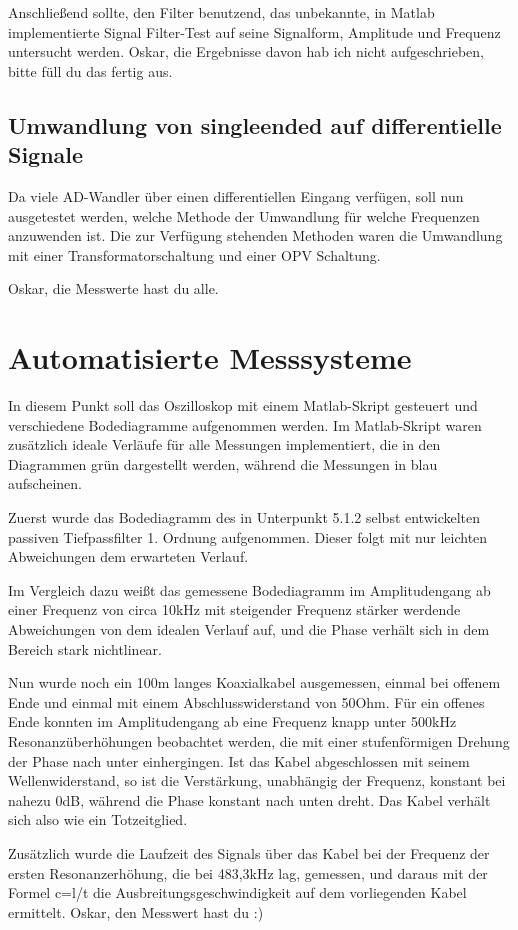 Anschließend sollte, den Filter benutzend, das unbekannte, in Matlab implementierte Signal Filter-Test auf seine Signalform, Amplitude und Frequenz untersucht werden. Oskar, die Ergebnisse davon hab ich nicht aufgeschrieben, bitte füll du das fertig aus.

\subsection{Umwandlung von singleended auf differentielle Signale}

Da viele AD-Wandler über einen differentiellen Eingang verfügen, soll nun ausgetestet werden, welche Methode der Umwandlung für welche Frequenzen anzuwenden ist. Die zur Verfügung stehenden Methoden waren die Umwandlung mit einer Transformatorschaltung und einer OPV Schaltung.

Oskar, die Messwerte hast du alle.
\section{Automatisierte Messsysteme}

In diesem Punkt soll das Oszilloskop mit einem Matlab-Skript gesteuert und verschiedene Bodediagramme aufgenommen werden. Im Matlab-Skript waren zusätzlich ideale Verläufe für alle Messungen implementiert, die in den Diagrammen grün dargestellt werden, während die Messungen in blau aufscheinen.

Zuerst wurde das Bodediagramm des in Unterpunkt 5.1.2 selbst entwickelten passiven Tiefpassfilter 1. Ordnung aufgenommen. Dieser folgt mit nur leichten Abweichungen dem erwarteten Verlauf.

Im Vergleich dazu weißt das gemessene Bodediagramm im Amplitudengang ab einer Frequenz von circa 10kHz mit steigender Frequenz stärker werdende Abweichungen von dem idealen Verlauf auf, und die Phase verhält sich in dem Bereich stark nichtlinear.

Nun wurde noch ein 100m langes Koaxialkabel ausgemessen, einmal bei offenem Ende und einmal mit einem Abschlusswiderstand von 50Ohm. Für ein offenes Ende konnten im Amplitudengang ab eine Frequenz knapp unter 500kHz Resonanzüberhöhungen beobachtet werden, die mit einer stufenförmigen Drehung der Phase nach unter einhergingen. Ist das Kabel abgeschlossen mit seinem Wellenwiderstand, so ist die Verstärkung, unabhängig der Frequenz, konstant bei nahezu 0dB, während die Phase konstant nach unten dreht. Das Kabel verhält sich also wie ein Totzeitglied.

Zusätzlich wurde die Laufzeit des Signals über das Kabel bei der Frequenz der ersten Resonanzerhöhung, die bei 483,3kHz lag, gemessen, und daraus mit der Formel c=l/t die Ausbreitungsgeschwindigkeit auf dem vorliegenden Kabel ermittelt.
Oskar, den Messwert hast du :)